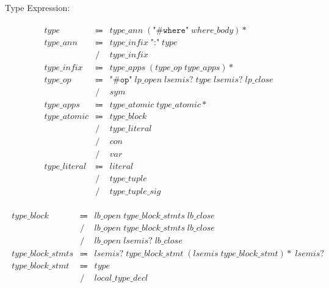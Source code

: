 Type Expression:

\begin{align*}
    \begin{array}{rcll}
        \mathit{type}
        &\Coloneq &\mathit{type\_ann}\; (\texttt{"\#where"}\; \mathit{where\_body}){*} \\
        \mathit{type\_ann}
        &\Coloneq &\mathit{type\_infix}\; \texttt{":"}\; \mathit{type} \\
        &\mathrel{/} &\mathit{type\_infix} \\
        \mathit{type\_infix}
        &\Coloneq &\mathit{type\_apps}\; (\mathit{type\_op}\; \mathit{type\_apps}){*} \\
        \mathit{type\_op}
        &\Coloneq &\texttt{"\#op"}\; \mathit{lp\_open}\; \mathit{lsemis}{?}\; \mathit{type}\; \mathit{lsemis}{?}\; \mathit{lp\_close} \\
        &\mathrel{/} &\mathit{sym} \\
        \mathit{type\_apps}
        &\Coloneq &\mathit{type\_atomic}\; \mathit{type\_atomic}{*} \\
        \mathit{type\_atomic}
        &\Coloneq &\mathit{type\_block} \\
        &\mathrel{/} &\mathit{type\_literal} \\
        &\mathrel{/} &\mathit{con} \\
        &\mathrel{/} &\mathit{var} \\
        \mathit{type\_literal}
        &\Coloneq &\mathit{literal} \\
        &\mathrel{/} &\mathit{type\_tuple} \\
        &\mathrel{/} &\mathit{type\_tuple\_sig}
    \end{array}
\end{align*}

\begin{align*}
    \begin{array}{rcll}
        \mathit{type\_block}
        &\Coloneq &\mathit{lb\_open}\; \mathit{type\_block\_stmts}\; \mathit{lb\_close} \\
        &\mathrel{/} &\mathit{lb\_open}\; \mathit{type\_block\_stmts}\; \mathit{lb\_close} \\
        &\mathrel{/} &\mathit{lb\_open}\; \mathit{lsemis}{?}\; \mathit{lb\_close} \\
        \mathit{type\_block\_stmts}
        &\Coloneq &\mathit{lsemis}{?}\; \mathit{type\_block\_stmt}\; (\mathit{lsemis}\; \mathit{type\_block\_stmt}){*}\; \mathit{lsemis}{?} \\
        \mathit{type\_block\_stmt}
        &\Coloneq &\mathit{type} \\
        &\mathrel{/} &\mathit{local\_type\_decl}
    \end{array}
\end{align*}

